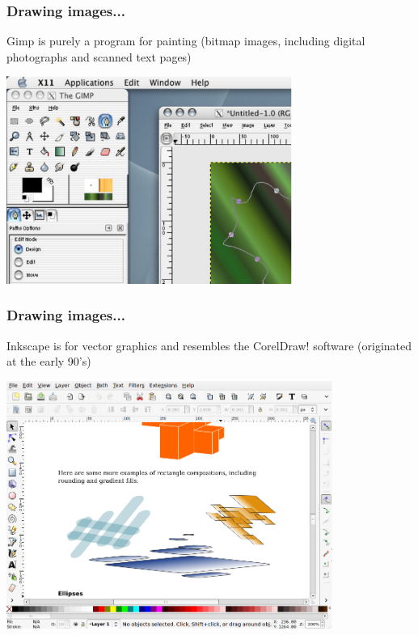 \documentclass[13pt]{beamer}
\begin{document}
\begin{frame}[fragile]\frametitle{Drawing images...}
Gimp is purely a program for painting (bitmap images, including digital 
photographs and scanned text pages)
\begin{center}
\includegraphics[width=0.7\textwidth]{img/gimpmac}
\end{center}
\end{frame}

\begin{frame}[fragile]\frametitle{Drawing images...}
Inkscape is for vector graphics and resembles the CorelDraw! software
(originated at the early 90's)
\begin{center}
\includegraphics[width=0.8\textwidth]{img/Inkscape}
\end{center}
\end{frame}
\end{document}
